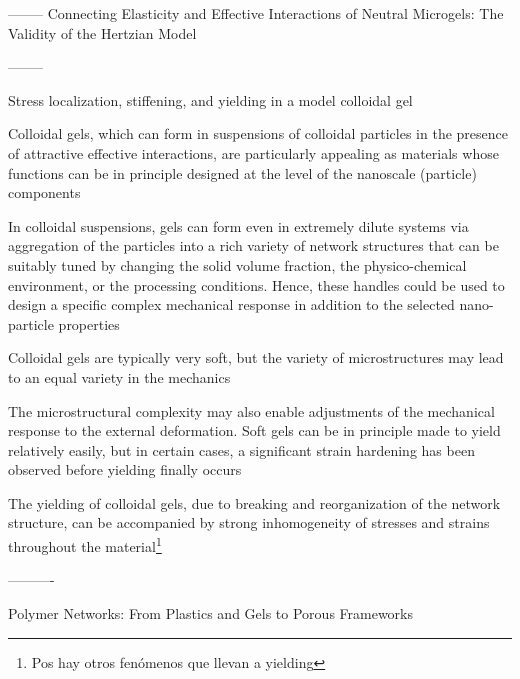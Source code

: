 \documentclass[../../main-notes.tex]{subfiles}
\begin{document}
--------
Connecting Elasticity and Effective Interactions of Neutral Microgels: The Validity of the Hertzian Model\citep{rovigattiConnectingElasticityEffective2019}



--------

Stress localization, stiffening, and yielding in a model colloidal gel\citep{colomboStressLocalizationStiffening2014}

Colloidal gels, which can form in suspensions of colloidal particles in the presence of attractive effective interactions, are particularly appealing as materials whose functions can be in principle designed at the level of the nanoscale (particle) components

In colloidal suspensions, gels can form even in extremely dilute systems via aggregation of the particles into a rich variety of network structures that can be suitably tuned by changing the solid volume fraction, the physico-chemical environment, or the processing conditions. Hence, these handles could be used to design a specific complex mechanical response in addition to the selected nano-particle properties

Colloidal gels are typically very soft, but the variety of microstructures may lead to an equal variety in the mechanics

The microstructural complexity may also enable adjustments of the mechanical response to the external deformation. Soft gels can be in principle made to yield relatively easily, but in certain cases, a significant strain hardening has been observed before yielding finally occurs

The yielding of colloidal gels, due to breaking and reorganization of the network structure, can be accompanied by strong inhomogeneity of stresses and strains throughout the material\footnote{Pos hay otros fenómenos que llevan a yielding}

----------

Polymer Networks: From Plastics and Gels to Porous Frameworks\citep{guPolymerNetworksPlastics2020}
\end{document}
